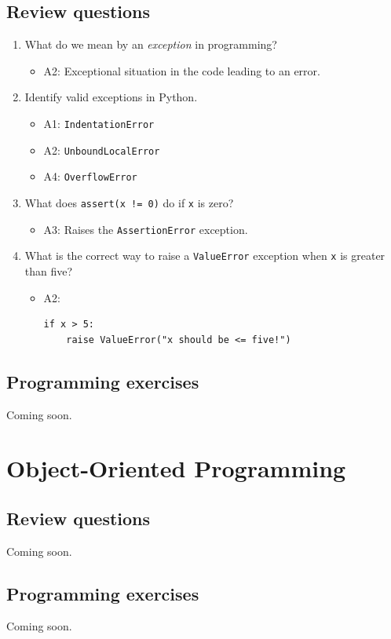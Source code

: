 \documentclass[article,A4,12pt]{llncs}
\begin{document}
\subsection{Review questions}

\begin{enumerate}
\item What do we mean by an {\em exception} in programming?
  \begin{itemize}
    \item A2: Exceptional situation in the code leading to an error. 
  \end{itemize}
\item Identify valid exceptions in Python.
  \begin{itemize}
    \item A1: {\tt IndentationError}
    \item A2: {\tt UnboundLocalError}
    \item A4: {\tt OverflowError}
  \end{itemize}
\item What does {\tt assert(x != 0)} do if {\tt x} is zero?
  \begin{itemize}
    \item A3: Raises the {\tt AssertionError} exception.
  \end{itemize}
\item What is the correct way to raise a {\tt ValueError} exception 
      when {\tt x} is greater than five?
  \begin{itemize}
    \item A2:
\begin{verbatim}
if x > 5:
    raise ValueError("x should be <= five!")
\end{verbatim}
  \end{itemize}
\end{enumerate}


\subsection{Programming exercises}

Coming soon.

\section{Object-Oriented Programming}

\subsection{Review questions}

Coming soon.

\subsection{Programming exercises}

Coming soon.
\end{document}
